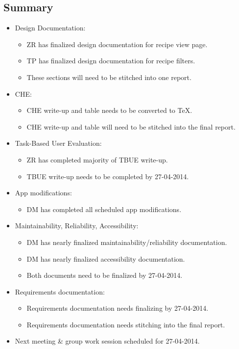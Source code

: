 \documentclass{article}
\begin{document}
\subsection*{Summary}
\begin{itemize}
\item Design Documentation:
  \begin{itemize}
  \item ZR has finalized design documentation for recipe view page.
  \item TP has finalized design documentation for recipe filters.
  \item These sections will need to be stitched into one report.
  \end{itemize}
\item CHE:
  \begin{itemize}
  \item CHE write-up and table needs to be converted to TeX.
  \item CHE write-up and table will need to be stitched into the final report.
  \end{itemize}
\item Task-Based User Evaluation:
  \begin{itemize}
  \item ZR has completed majority of TBUE write-up.
  \item TBUE write-up needs to be completed by 27-04-2014.
  \end{itemize}
\item App modifications:
  \begin{itemize}
  \item DM has completed all scheduled app modifications.
  \end{itemize}
\item Maintainability, Reliability, Accessibility:
  \begin{itemize}
  \item DM has nearly finalized maintainability/reliability documentation.
  \item DM has nearly finalized accessibility documentation.
  \item Both documents need to be finalized by 27-04-2014.
  \end{itemize}
\item Requirements documentation:
  \begin{itemize}
  \item Requirements documentation needs finalizing by 27-04-2014.
  \item Requirements documentation needs stitching into the final report.
  \end{itemize}
\item Next meeting \& group work session scheduled for 27-04-2014.
\end{itemize}
\end{document}

